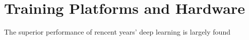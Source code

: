 \section{Training Platforms and Hardware}
The superior performance of rencent years' deep learning is largely found